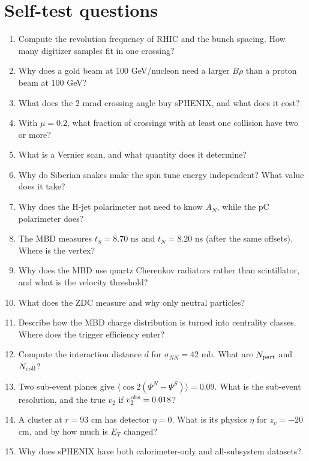 \documentclass[11pt,letterpaper]{article}
\begin{document}
\section{Self-test questions}\label{sec:selftest}
\begin{enumerate}[label=Q\arabic*.]
\item Compute the revolution frequency of RHIC and the bunch spacing. How many digitizer samples fit in one crossing?
\item Why does a gold beam at 100 GeV/nucleon need a larger $B\rho$ than a proton beam at 100 GeV?
\item What does the 2 mrad crossing angle buy sPHENIX, and what does it cost?
\item With $\mu=0.2$, what fraction of crossings with at least one collision have two or more?
\item What is a Vernier scan, and what quantity does it determine?
\item Why do Siberian snakes make the spin tune energy independent? What value does it take?
\item Why does the H-jet polarimeter not need to know $A_N$, while the pC polarimeter does?
\item The MBD measures $t_S=8.70$ ns and $t_N=8.20$ ns (after the same offsets). Where is the vertex?
\item Why does the MBD use quartz Cherenkov radiators rather than scintillator, and what is the velocity threshold?
\item What does the ZDC measure and why only neutral particles?
\item Describe how the MBD charge distribution is turned into centrality classes. Where does the trigger efficiency enter?
\item Compute the interaction distance $d$ for $\sigma_{NN}=42$ mb. What are $N_{\rm part}$ and $N_{\rm coll}$?
\item Two sub-event planes give $\langle\cos2(\Psi^N-\Psi^S)\rangle=0.09$. What is the sub-event resolution, and the true $v_2$ if $v_2^{\rm obs}=0.018$?
\item A cluster at $r=93$ cm has detector $\eta=0$. What is its physics $\eta$ for $z_v=-20$ cm, and by how much is $E_T$ changed?
\item Why does sPHENIX have both calorimeter-only and all-subsystem datasets?
\end{enumerate}
\end{document}
